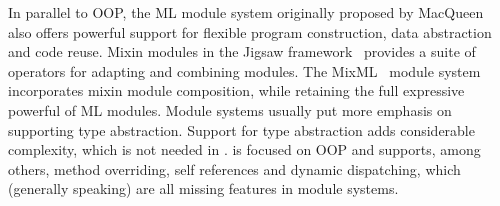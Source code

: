 In parallel to OOP, the ML module system originally proposed by
MacQueen~\citep{MacQueen_1984} also offers powerful support for flexible program
construction, data abstraction and code reuse. Mixin modules in the
Jigsaw framework~\citep{Bracha92modularitymeets} provides a suite of operators
for adapting and combining modules. The MixML~\citep{Rossberg_2013} module
system incorporates mixin module composition, while retaining the full
expressive powerful of ML modules. Module systems usually put more emphasis on
supporting type abstraction. Support for type abstraction
adds considerable complexity, which is not needed in \namee. \namee is focused on
OOP and supports, among others, method overriding, self references and dynamic
dispatching, which (generally speaking) are all missing features in module systems.





